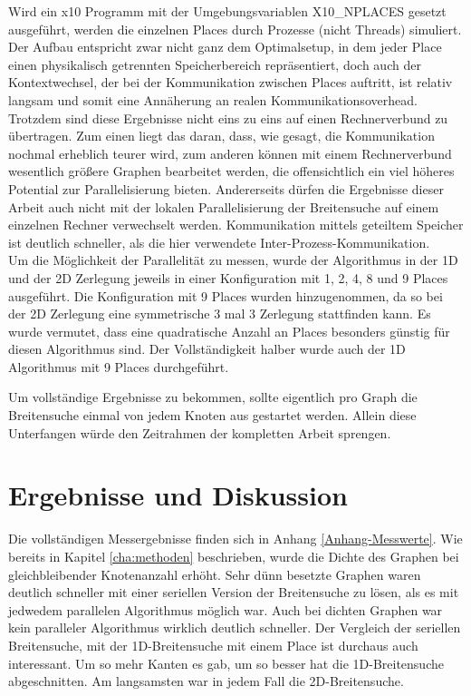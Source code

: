 Wird ein x10 Programm mit der Umgebungsvariablen X10\_NPLACES gesetzt ausgeführt, werden die einzelnen Places durch Prozesse (nicht Threads) simuliert. Der Aufbau entspricht zwar nicht ganz dem Optimalsetup, in dem jeder Place einen physikalisch getrennten Speicherbereich repräsentiert, doch auch der Kontextwechsel, der bei der Kommunikation zwischen Places auftritt, ist relativ langsam und somit eine Annäherung an realen Kommunikationsoverhead. Trotzdem sind diese Ergebnisse nicht eins zu eins auf einen Rechnerverbund zu übertragen. Zum einen liegt das daran, dass, wie gesagt, die Kommunikation nochmal erheblich teurer wird, zum anderen können mit einem Rechnerverbund wesentlich größere Graphen bearbeitet werden, die offensichtlich ein viel höheres Potential zur Parallelisierung bieten. Andererseits dürfen die Ergebnisse dieser Arbeit auch nicht mit der lokalen Parallelisierung der Breitensuche auf einem einzelnen Rechner verwechselt werden. Kommunikation mittels geteiltem Speicher ist deutlich schneller, als die hier verwendete Inter-Prozess-Kommunikation. \\
Um die Möglichkeit der Parallelität zu messen, wurde der Algorithmus in der 1D und der 2D Zerlegung jeweils in einer Konfiguration mit 1, 2, 4, 8 und 9 Places ausgeführt. Die Konfiguration mit 9 Places wurden hinzugenommen, da so bei der 2D Zerlegung eine symmetrische 3 mal 3 Zerlegung stattfinden kann. Es wurde vermutet, dass eine quadratische Anzahl an Places besonders günstig für diesen Algorithmus sind. Der Vollständigkeit halber wurde auch der 1D Algorithmus mit 9 Places durchgeführt.

Um vollständige Ergebnisse zu bekommen, sollte eigentlich pro Graph die Breitensuche einmal von jedem Knoten aus gestartet werden. Allein diese Unterfangen würde den Zeitrahmen der kompletten Arbeit sprengen.     

\chapter{Ergebnisse und Diskussion} %
\label{cha:ergebnisse_und_diskussion}

Die vollständigen Messergebnisse finden sich in Anhang \ref{Anhang-Messwerte}. Wie bereits in Kapitel \ref{cha:methoden} beschrieben, wurde die Dichte des Graphen bei gleichbleibender Knotenanzahl erhöht. Sehr dünn besetzte Graphen waren deutlich schneller mit einer seriellen Version der Breitensuche zu lösen, als es mit jedwedem parallelen Algorithmus möglich war. Auch bei dichten Graphen war kein paralleler Algorithmus wirklich deutlich schneller. Der Vergleich der seriellen Breitensuche, mit der 1D-Breitensuche mit einem Place ist durchaus auch interessant. Um so mehr Kanten es gab, um so besser hat die 1D-Breitensuche abgeschnitten. Am langsamsten war in jedem Fall die 2D-Breitensuche.

